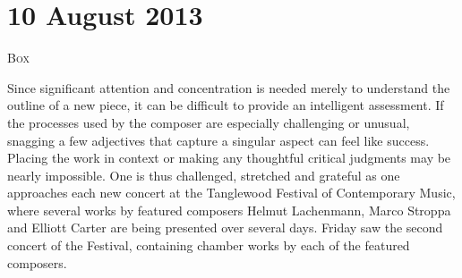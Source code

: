 \chapter{10 August 2013}

\textsc{Box}

Since significant attention and concentration is needed merely to understand the outline of a new piece, it can be difficult to provide an intelligent assessment. If the processes used by the composer are especially challenging or unusual, snagging a few adjectives that capture a singular aspect can feel like success. Placing the work in context or making any thoughtful critical judgments may be nearly impossible. One is thus challenged, stretched and grateful as one approaches each new concert at the Tanglewood Festival of Contemporary Music, where several works by featured composers Helmut Lachenmann, Marco Stroppa and Elliott Carter are being presented over several days. Friday saw the second concert of the Festival, containing chamber works by each of the featured composers.
